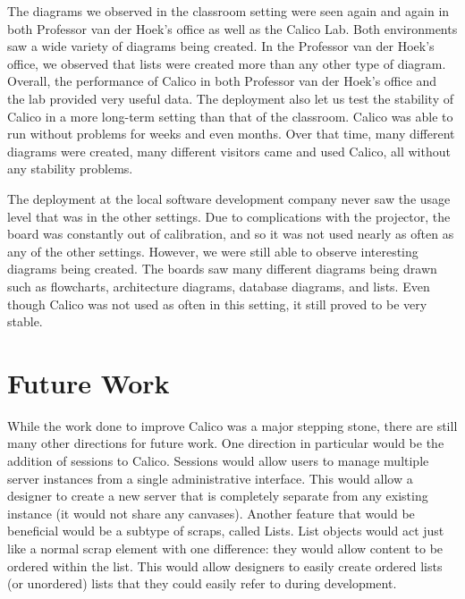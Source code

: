 The diagrams we observed in the classroom setting were seen again and again in both Professor van der Hoek's office as well as the Calico Lab. Both environments saw a wide variety of diagrams being created. In the Professor van der Hoek's office, we observed that lists were created more than any other type of diagram. Overall, the performance of Calico in both Professor van der Hoek's office and the lab provided very useful data. The deployment also let us test the stability of Calico in a more long-term setting than that of the classroom. Calico was able to run without problems for weeks and even months. Over that time, many different diagrams were created, many different visitors came and used Calico, all without any stability problems. 


The deployment at the local software development company never saw the usage level that was in the other settings. Due to complications with the projector, the board was constantly out of calibration, and so it was not used nearly as often as any of the other settings. However, we were still able to observe interesting diagrams being created. The boards saw many different diagrams being drawn such as flowcharts, architecture diagrams, database diagrams, and lists. Even though Calico was not used as often in this setting, it still proved to be very stable.

\section*{Future Work}
While the work done to improve Calico was a major stepping stone, there are still many other directions for future work. One direction in particular would be the addition of sessions to Calico. Sessions would allow users to manage multiple server instances from a single administrative interface. This would allow a designer to create a new server that is completely separate from any existing instance (it would not share any canvases). Another feature that would be beneficial would be a subtype of scraps, called Lists. List objects would act just like a normal scrap element with one difference: they would allow content to be ordered within the list. This would allow designers to easily create ordered lists (or unordered) lists that they could easily refer to during development. 